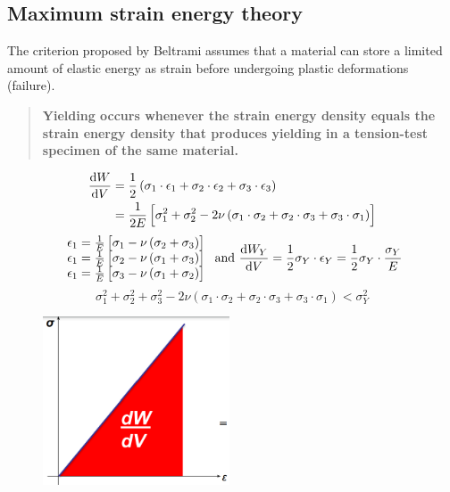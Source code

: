 \documentclass[class=report, crop=false, 12pt,a4paper]{standalone}
\begin{document}
\subsection{Maximum strain energy theory}
The criterion proposed by Beltrami assumes that a material can store a limited amount of elastic energy as strain before undergoing plastic deformations (failure).
\begin{quotation}
  \textbf{Yielding occurs whenever the strain energy density equals the strain energy density that produces yielding in a tension-test specimen of the same material.}
\end{quotation}
\begin{align}
  \frac{\dif W}{\dif V} &= \frac{1}{2} \left( \sigma_1 \cdot \epsilon_1 + \sigma_2 \cdot \epsilon_2 + \sigma_3 \cdot \epsilon_3 \right)\\
  &= \frac{1}{2E} \left[ \sigma_1^2 + \sigma_2^2 - 2\nu\left(\sigma_1 \cdot \sigma_2 + \sigma_2 \cdot \sigma_3 + \sigma_3 \cdot \sigma_1 \right) \right]
\end{align}
\begin{equation}
  \begin{array}{l}
    \epsilon_1 = \frac{1}{E} \left[\sigma_1 - \nu \left(\sigma_2 + \sigma_3\right)\right]\\
    \epsilon_1 = \frac{1}{E} \left[\sigma_2 - \nu \left(\sigma_1 + \sigma_3\right)\right]\\
    \epsilon_1 = \frac{1}{E} \left[\sigma_3 - \nu \left(\sigma_1 + \sigma_2\right)\right]
  \end{array} \textrm{ and } \frac{\dif W_Y}{\dif V} = \frac{1}{2} \sigma_Y \cdot \epsilon_Y = \frac{1}{2}\sigma_Y \cdot \frac{\sigma_Y}{E}
\end{equation}
\begin{equation}
  \sigma_1^2 + \sigma_2^2 + \sigma_3^2 - 2\nu \left(\sigma_1 \cdot \sigma_2 + \sigma_2 \cdot \sigma_3 + \sigma_3 \cdot \sigma_1 \right) < \sigma_Y^2
\end{equation}
\begin{figure}[H]
  \centering
  \includegraphics[height = 5cm]{../img/diagram91.png}
  \caption{}
\end{figure}
\end{document}
